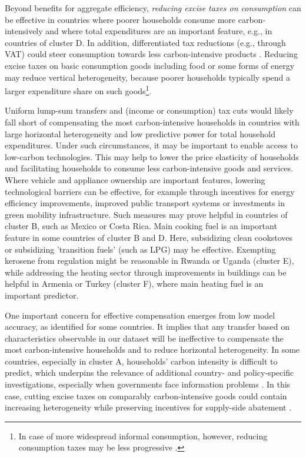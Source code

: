 \documentclass[12pt, a4paper]{article}
\begin{document}
Beyond benefits for aggregate efficiency, \textit{reducing excise taxes on consumption} can be effective in countries where poorer households consume more carbon-intensively and where total expenditures are an important feature, e.g., in countries of cluster D. In addition, differentiated tax reductions (e.g., through VAT) could steer consumption towards less carbon-intensive products \autocite{Klenert.2023}. Reducing excise taxes on basic consumption goods including food or some forms of energy may reduce vertical heterogeneity, because poorer households typically spend a larger expenditure share on such goods\footnote{In case of more widespread informal consumption, however, reducing consumption taxes may be less progressive \autocite{Bachas.2020}.}. 

Uniform lump-sum transfers and (income or consumption) tax cuts would likely fall short of compensating the most carbon-intensive households in countries with large horizontal heterogeneity and low predictive power for total household expenditures. Under such circumstances, it may be important to enable access to low-carbon technologies. This may help to lower the price elasticity of households and facilitating households to consume less carbon-intensive goods and services. Where vehicle and appliance ownership are important features, lowering technological barriers can be effective, for example through incentives for energy efficiency improvements, improved public transport systems or investments in green mobility infrastructure. Such measures may prove helpful in countries of cluster B, such as Mexico or Costa Rica. %
Main cooking fuel is an important feature in some countries of cluster B and D. Here, subsidizing clean cookstoves or subsidizing 'transition fuels' (such as LPG) may be effective. Exempting kerosene from regulation might be reasonable in Rwanda or Uganda (cluster E), while addressing the heating sector through improvements in buildings can be helpful in Armenia or Turkey (cluster F), where main heating fuel is an important predictor. %

One important concern for effective compensation emerges from low model accuracy, as identified for some countries. It implies that any transfer based on characteristics observable in our dataset will be ineffective to compensate the most carbon-intensive households and to reduce horizontal heterogeneity. In some countries, especially in cluster A, households' carbon intensity is difficult to predict, which underpins the relevance of additional country- and policy-specific investigations, especially when governments face information problems \autocite{Mirrlees.1971}. In this case, cutting excise taxes on comparably carbon-intensive goods could contain increasing heterogeneity while preserving incentives for supply-side abatement \autocite{Goulder.2008}.
\end{document}
